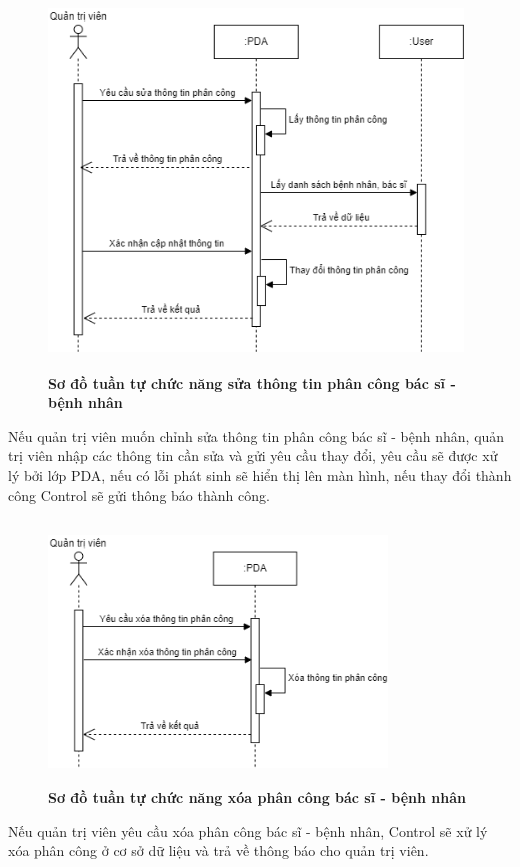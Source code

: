 \begin{figure}[H]
  \centering
  \includegraphics[width=11cm,height=10cm]{Images/sequence/sequence_manage_edit_pda.png}
  \caption[Sơ đồ tuần tự chức năng sửa thông tin phân công bác sĩ - bệnh nhân]{\bfseries \fontsize{12pt}{0pt}
  \selectfont Sơ đồ tuần tự chức năng sửa thông tin phân công bác sĩ - bệnh nhân}
  \label{sequence_manage_edit_pda} %
\end{figure}
Nếu quản trị viên muốn chỉnh sửa thông tin phân công bác sĩ - bệnh nhân, quản trị viên nhập các thông tin cần sửa và gửi yêu cầu thay đổi, 
yêu cầu sẽ được xử lý bởi lớp PDA, nếu có lỗi phát sinh sẽ hiển thị lên màn hình, nếu thay đổi thành công Control sẽ gửi thông báo thành công. 
\begin{figure}[H]
  \centering
  \includegraphics[width=9cm,height=7cm]{Images/sequence/sequence_manage_delete_pda.png}
  \caption[Sơ đồ tuần tự chức năng xóa phân công bác sĩ - bệnh nhân]{\bfseries \fontsize{12pt}{0pt}
  \selectfont Sơ đồ tuần tự chức năng xóa phân công bác sĩ - bệnh nhân}
  \label{sequence_manage_delete_pda} %
\end{figure}
Nếu quản trị viên yêu cầu xóa phân công bác sĩ - bệnh nhân, Control sẽ xử lý xóa phân công ở cơ sở dữ liệu và trả về thông báo cho quản trị viên.

